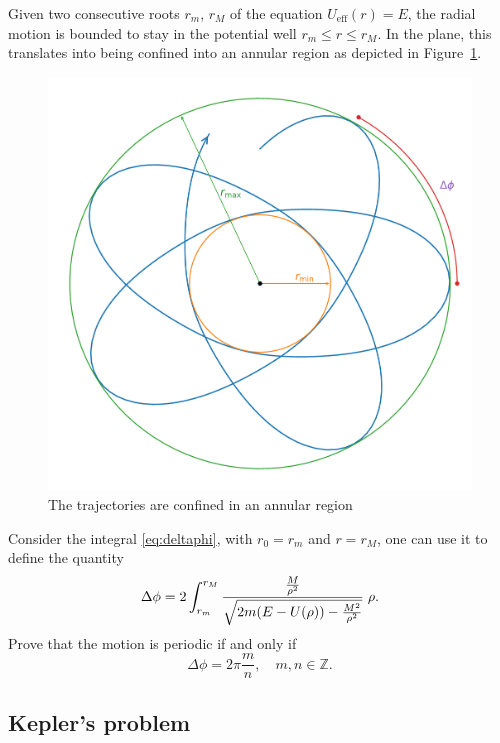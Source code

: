 \documentclass[english,fontsize=11pt,paper=a5,oneside]{scrbook}
\newcommand{\Z}{\mathbb{Z}}
\let\d\relax
\newcommand{\d}{\mathrm{d}}
\theoremstyle{definition}
\newenvironment{exercise}
  {\pushQED{\qed}\renewcommand{\qedsymbol}{$\maltese$}\exercisex}
  {\popQED\endexercisex}
\begin{document}
Given two consecutive roots $r_m$, $r_M$ of the equation $U_{\mathrm{eff}}(r) = E$, the radial motion is bounded to stay in the potential well $r_m \leq r \leq r_M$.
In the plane, this translates into being confined into an annular region as depicted in Figure~\ref{fig:annregio}.

\begin{figure}[ht]
  \centering
  \includegraphics[width=0.75\linewidth]{images/annular-region.pdf}
  \caption{The trajectories are confined in an annular region \cite{book:ll}}
  \label{fig:annregio}
\end{figure}

\begin{exercise}
  Consider the integral \eqref{eq:deltaphi}, with $r_0 = r_m$ and $r = r_M$, one can use it to define the quantity
  \begin{equation}\label{eq:Dektaphi}
    \Delta \phi = 2\int_{r_m}^{r_M} \frac{\frac{M}{\rho^2}}{\sqrt{2m(E-U(\rho)) - \frac{M^2}{\rho^2}}}\;\d \rho.
  \end{equation}
  Prove that the motion is periodic if and only if
  \begin{equation}
    \Delta \phi = 2\pi \frac mn, \quad m,n\in\Z.
  \end{equation}
\end{exercise}

\subsection{Kepler's problem}
\end{document}
